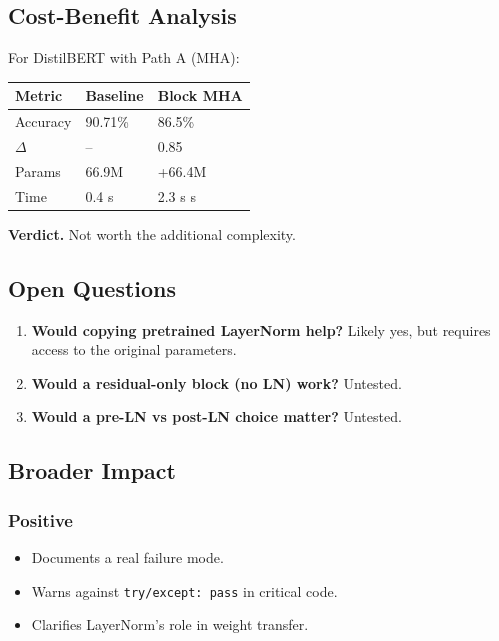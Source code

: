 \subsection{Cost-Benefit Analysis}

For DistilBERT with Path A (MHA):

\begin{table}[H]
\centering
\small
\begin{tabular}{lll}
\toprule
\textbf{Metric} & \textbf{Baseline} & \textbf{Block MHA} \\
\midrule
Accuracy & 90.71\% & 86.5\% \\
$\Delta$ & -- & 0.85 \\
Params & 66.9M & +66.4M \\
Time & 0.4 s & 2.3 s s \\
\bottomrule
\end{tabular}
\end{table}

\textbf{Verdict.} Not worth the additional complexity.

\subsection{Open Questions}

\begin{enumerate}
\item \textbf{Would copying pretrained LayerNorm help?} Likely yes, but requires
  access to the original parameters.
\item \textbf{Would a residual-only block (no LN) work?} Untested.
\item \textbf{Would a pre-LN vs post-LN choice matter?} Untested.

\end{enumerate}
\subsection{Broader Impact}

\subsubsection{Positive}

\begin{itemize}
\item Documents a real failure mode.
\item Warns against \texttt{try/except: pass} in critical code.
\item Clarifies LayerNorm's role in weight transfer.

\end{itemize}
